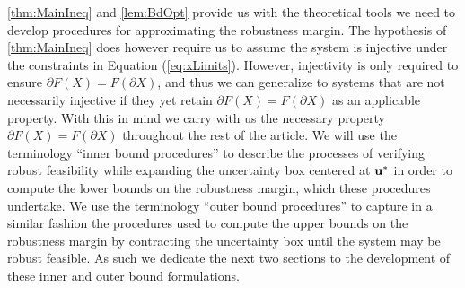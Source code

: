 \cref{thm:MainIneq} and \cref{lem:BdOpt} provide us with the theoretical tools we need to develop procedures for approximating the robustness margin.
The hypothesis of \cref{thm:MainIneq} does however require us to assume the system is injective under the constraints in Equation (\ref{eq:xLimits}).
However, injectivity is only required to ensure $\partial F(X) = F(\partial X)$, and thus we can generalize to systems that are not necessarily injective if they yet retain $\partial F(X) = F(\partial X)$ as an applicable property. 
With this in mind we carry with us the necessary property $\partial F(X) = F(\partial X)$ throughout the rest of the article. 
We will use the terminology \enquote{inner bound procedures} to describe the processes of verifying robust feasibility while expanding the uncertainty box centered at $\mathbf{u}^*$ in order to compute the lower bounds on the robustness margin, which these procedures undertake. 
We use the terminology \enquote{outer bound procedures} to capture in a similar fashion the procedures used to compute the upper bounds on the robustness margin by contracting the uncertainty box until the system may be robust feasible. 
As such we dedicate the next two sections to the development of these inner and outer bound formulations. 
